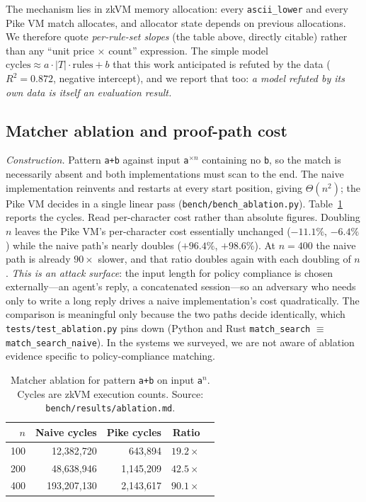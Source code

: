 \documentclass[10pt,journal,compsoc]{IEEEtran}
\newcommand{\tabfont}{\footnotesize}
\begin{document}
The mechanism lies in zkVM memory allocation: every \texttt{ascii\_lower} and
every Pike VM match allocates, and allocator state depends on previous
allocations. We therefore quote \emph{per-rule-set slopes} (the table above,
directly citable) rather than any ``unit price $\times$ count'' expression. The
simple model $\text{cycles} \approx a\cdot|T|\cdot\text{rules} + b$ that this
work anticipated is refuted by the data ($R^2 = 0.872$, negative intercept), and
we report that too: \emph{a model refuted by its own data is itself an evaluation
result.}

\subsection{Matcher ablation and proof-path cost}
\label{sec:eval-ablation}

\emph{Construction.} Pattern \texttt{a+b} against input
\texttt{a}$^{\times n}$ containing no \texttt{b}, so the match is necessarily
absent and both implementations must scan to the end. The naive implementation
reinvents and restarts at every start position, giving $\Theta(n^2)$; the Pike VM
decides in a single linear pass (\texttt{bench/bench\_ablation.py}).
Table~\ref{tab:ablation} reports the cycles. Read per-character cost rather than
absolute figures. Doubling $n$ leaves the Pike VM's per-character cost
essentially unchanged ($-11.1\%$, $-6.4\%$) while the naive path's nearly doubles
($+96.4\%$, $+98.6\%$). At $n = 400$ the naive path is already $90\times$ slower,
and that ratio doubles again with each doubling of $n$. \emph{This is an attack
surface}: the input length for policy compliance is chosen externally---an
agent's reply, a concatenated session---so an adversary who needs only to write a
long reply drives a naive implementation's cost quadratically. The comparison is
meaningful only because the two paths decide identically, which
\texttt{tests/test\_ablation.py} pins down (Python and Rust
\texttt{match\_search} $\equiv$ \texttt{match\_search\_naive}). In the systems we
surveyed, we are not aware of ablation evidence specific to policy-compliance
matching.

\begin{table}[t]
\centering
\caption{Matcher ablation for pattern \texttt{a+b} on input \texttt{a}$^n$.
Cycles are zkVM execution counts. Source:
\texttt{bench/results/ablation.md}.}
\label{tab:ablation}
\tabfont
\begin{tabular}{@{}rrrrr@{}}
\toprule
$n$ & Naive cycles & Pike cycles & Ratio \\
\midrule
100 & 12{,}382{,}720  & 643{,}894   & $19.2\times$ \\
200 & 48{,}638{,}946  & 1{,}145{,}209 & $42.5\times$ \\
400 & 193{,}207{,}130 & 2{,}143{,}617 & $90.1\times$ \\
\bottomrule
\end{tabular}
\end{table}
\end{document}
